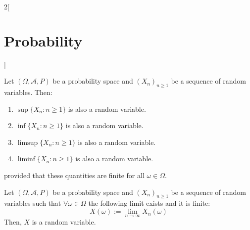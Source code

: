\documentclass[../../../main.tex]{subfiles}
\begin{document}
\begin{multicols}{2}[\section{Probability}]
\begin{prop}
\begin{enumerate}
    \end{enumerate}
  \end{prop}
  \begin{prop}
    Let $(\Omega,\mathcal{A},P)$ be a probability space and $(X_n)_{n\geq 1}$ be a sequence of random variables. Then:
    \begin{enumerate}
      \item $\sup\{X_n:n\geq 1\}$ is also a random variable.
      \item $\inf\{X_n:n\geq 1\}$ is also a random variable.
      \item $\limsup\{X_n:n\geq 1\}$ is also a random variable.
      \item $\liminf\{X_n:n\geq 1\}$ is also a random variable.
    \end{enumerate}
    provided that these quantities are finite for all $\omega\in\Omega$.
  \end{prop}
  \begin{corollary}
    Let $(\Omega,\mathcal{A},P)$ be a probability space and $(X_n)_{n\geq 1}$ be a sequence of random variables such that $\forall\omega\in\Omega$ the following limit exists and it is finite: $$X(\omega):=\lim_{n\to\infty}X_n(\omega)$$
    Then, $X$ is a random variable.
  \end{corollary}

\end{multicols}
\end{document}
